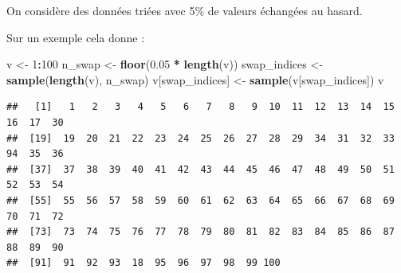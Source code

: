 \documentclass[
]{article}
\newenvironment{Shaded}{\begin{snugshade}}{\end{snugshade}}
\newcommand{\DecValTok}[1]{\textcolor[rgb]{0.00,0.00,0.81}{#1}}
\newcommand{\FloatTok}[1]{\textcolor[rgb]{0.00,0.00,0.81}{#1}}
\newcommand{\FunctionTok}[1]{\textcolor[rgb]{0.13,0.29,0.53}{\textbf{#1}}}
\newcommand{\NormalTok}[1]{#1}
\newcommand{\OtherTok}[1]{\textcolor[rgb]{0.56,0.35,0.01}{#1}}
\newcommand{\SpecialCharTok}[1]{\textcolor[rgb]{0.81,0.36,0.00}{\textbf{#1}}}
\begin{document}
On considère des données triées avec 5\% de valeurs échangées au hasard.

Sur un exemple cela donne :

\begin{Shaded}
\begin{Highlighting}[]
\NormalTok{v }\OtherTok{\textless{}{-}} \DecValTok{1}\SpecialCharTok{:}\DecValTok{100}
\NormalTok{n\_swap }\OtherTok{\textless{}{-}} \FunctionTok{floor}\NormalTok{(}\FloatTok{0.05} \SpecialCharTok{*} \FunctionTok{length}\NormalTok{(v))}
\NormalTok{swap\_indices }\OtherTok{\textless{}{-}} \FunctionTok{sample}\NormalTok{(}\FunctionTok{length}\NormalTok{(v), n\_swap)}
\NormalTok{v[swap\_indices] }\OtherTok{\textless{}{-}} \FunctionTok{sample}\NormalTok{(v[swap\_indices])}
\NormalTok{v}
\end{Highlighting}
\end{Shaded}

\begin{verbatim}
##   [1]   1   2   3   4   5   6   7   8   9  10  11  12  13  14  15  16  17  30
##  [19]  19  20  21  22  23  24  25  26  27  28  29  34  31  32  33  94  35  36
##  [37]  37  38  39  40  41  42  43  44  45  46  47  48  49  50  51  52  53  54
##  [55]  55  56  57  58  59  60  61  62  63  64  65  66  67  68  69  70  71  72
##  [73]  73  74  75  76  77  78  79  80  81  82  83  84  85  86  87  88  89  90
##  [91]  91  92  93  18  95  96  97  98  99 100
\end{verbatim}
\end{document}

